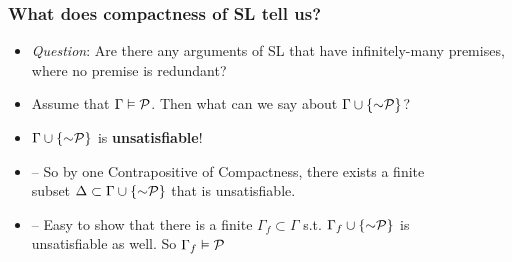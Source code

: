 \begin{frame}
\frametitle{What does compactness of SL tell us?}

\begin{itemize}[<+->]

\item \textit{Question}: Are there any arguments of SL that have infinitely-many premises, where no premise is redundant?

\item Assume that $\Gamma \vDash \mathcal{P}$. Then what can we say about $\Gamma \cup \{\enot \metav{P} \}$?


\item[] \qquad \qquad \qquad \qquad $\Gamma \cup \{\enot \metav{P} \}$ is \textbf{\textcolor{OGlyallpink}{unsatisfiable}}!


\item[] -- So by one \textcolor{OGlyallpink}{Contrapositive} of Compactness, there exists a finite \\  \qquad subset $\Delta \subset \Gamma \cup \{\enot \metav{P} \}$ that is \textcolor{OGlyallpink}{unsatisfiable}. 

\item[] -- Easy to show that there is a finite $\Gamma_f \subset \Gamma$ s.t. $\Gamma_f \cup \{\enot \metav{P} \}$ is \\ \qquad \textcolor{OGlyallpink}{unsatisfiable} as well. So $\Gamma_f \vDash \mathcal{P}$





\end{itemize}
\end{frame}
